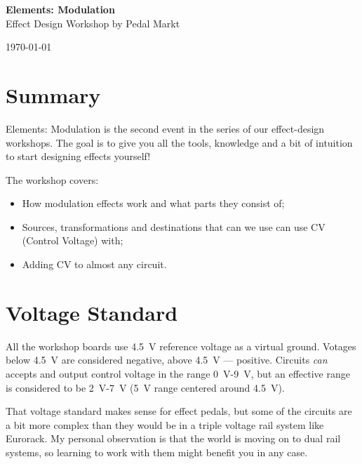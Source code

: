 \documentclass[a4paper,12pt]{article}
\begin{document}
\begin{titlepage}
  \begin{center}
    \Large\textbf{Elements: Modulation}\\
    \large{Effect Design Workshop by Pedal Markt}
  \end{center}
  \vspace*{\fill}
  \begin{center}
    \today
  \end{center}
\end{titlepage}

\section{Summary}

Elements: Modulation is the second event in the series of
our effect-design workshops. The goal is to give you all the
tools, knowledge and a bit of intuition to start designing
effects yourself!

The workshop covers:

\begin{itemize}
  \item How modulation effects work and what parts they
    consist of;
  \item Sources, transformations and destinations that can
    we use can use CV (Control Voltage) with;
  \item Adding CV to almost any circuit.
\end{itemize}

\section{Voltage Standard}

All the workshop boards use \SI{4.5}{\V} reference voltage
as a virtual ground. Votages below \SI{4.5}{\V} are
considered negative, above \SI{4.5}{\V} --- positive.
Circuits \textit{can} accepts and output control voltage in
the range \SI{0}{\V}-\SI{9}{\V}, but an effective range is
considered to be \SI{2}{\V}-\SI{7}{\V} (\SI{5}{\V} range
centered around \SI{4.5}{\V}).

That voltage standard makes sense for effect pedals, but
some of the circuits are a bit more complex than they would
be in a triple voltage rail system like Eurorack. My
personal observation is that the world is moving on to
dual rail systems, so learning to work with them might
benefit you in any case.
\end{document}

